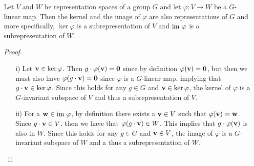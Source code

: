 \begin{proposition}\label{prop:kernelimagelinearmap}
	Let $V$ and $W$ be representation spaces of a group $G$ and let $\varphi: V \rightarrow W$ be a $G$-linear map. Then the kernel and the image of $\varphi$ are also representations of $G$ and more specifically, $\ker \varphi$ is a subrepresentation of $V$ and $\text{im } \varphi$ is a subrepresentation of $W$.
\end{proposition}
\begin{proof}
	\begin{itemize}
		\item[i)] Let $\mathbf{v} \in \ker \varphi$. Then $g \cdot \varphi (\mathbf{v}) = \mathbf{0}$ since by definition $\varphi(\mathbf{v}) = \mathbf{0}$, but then we must also have $\varphi ( g \cdot \mathbf{v} ) = \mathbf{0}$ since $\varphi$ is a $G$-linear map, implying that $g \cdot \mathbf{v} \in \ker \varphi$. Since this holds for any $g \in G$ and $\mathbf{v} \in \ker \varphi$, the kernel of $\varphi$ is a $G$-invariant subspace of $V$ and thus a subrepresentation of $V$. %
		\item[ii)] For a $\mathbf{w} \in \text{im } \varphi$, by definition there exists a $\mathbf{v} \in V$ such that $\varphi(\mathbf{v}) = \mathbf{w}$. Since $g \cdot \mathbf{v} \in V$, then we have that $\varphi ( g \cdot \mathbf{v}) \in W$. This implies that $g \cdot \varphi (\mathbf{v})$ is also in $W$. Since this holds for any $g \in G$ and $\mathbf{v} \in V$, the image of $\varphi$ is a $G$-invariant subspace of $W$ and a thus a subrepresentation of $W$.	\qedhere
	\end{itemize}
\end{proof}

